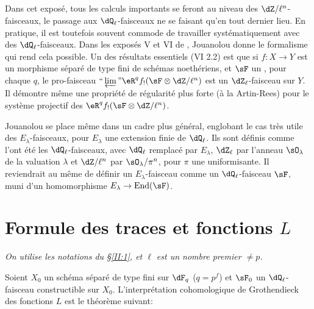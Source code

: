 \subsection{}\label{II:2-11}

Dans cet exposé, tous les calculs importants se feront au niveau des 
$\dZ/\ell^n$-faisceaux, le passage aux $\dQ_\ell$-faisceaux ne se faisant qu'en 
tout dernier lieu. En pratique, il est toutefois souvent commode de travailler 
systématiquement avec des $\dQ_\ell$-faisceaux. Dans les exposés 
V et VI de , Jouanolou donne le formalisme qui rend cela possible. 
Un des résultats essentiels (VI 2.2) est que si $f:X\to Y$ est un morphisme 
séparé de type fini de schémas noethériens, et $\sF$ un 
, pour chaque $q$, le pro-faisceau 
$\text{``}\varprojlim\text{''}\eR^q f_! (\sF\otimes\dZ/\ell^n)$ est un 
$\dZ_\ell$-faisceau sur $Y$. Il démontre même une propriété de 
régularité plus forte (à la Artin-Rees) pour le système projectif des 
$\eR^q f_!(\sF\otimes\dZ/\ell^n)$. 

Jouanolou se place même dans un cadre plus général, englobant le cas 
très utile des $E_\lambda$-faisceaux, pour $E_\lambda$ une extension finie de 
$\dQ_\ell$. Ils sont définis comme l'ont été les $\dQ_\ell$-faisceaux, 
avec $\dQ_\ell$ remplacé par $E_\lambda$, $\dZ_\ell$ par l'anneau 
$\sO_\lambda$ de la valuation $\lambda$ et $\dZ/\ell^n$ par 
$\sO_\lambda/\pi^n$, pour $\pi$ une uniformisante. Il reviendrait au même de 
définir un $E_\lambda$-faisceau comme un $\dQ_\ell$-faisceau $\sF$, muni 
d'un homomorphisme $E_\lambda\to\operatorname{End}(\sF)$. 










\section{Formule des traces et fonctions \texorpdfstring{$L$}{L}}\label{II:3}

\emph{On utilise les notations du \S\ref{II:1}, et $\ell$ est un nombre premier 
$\ne p$.}

Soient $X_0$ un schéma séparé de type fini sur $\dF_q$ ($q=p^f$) et 
$\sF_0$ un $\dQ_\ell$-faisceau constructible sur $X_0$. L'interprétation 
cohomologique de Grothendieck des fonctions $L$ est le théorème suivant: 





